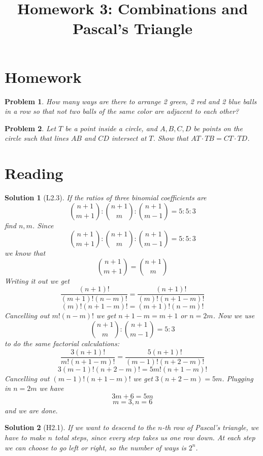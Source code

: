 \documentclass[a4paper,12pt]{article}
\title{Homework 3: Combinations and Pascal's Triangle}
\theoremstyle{perfect}
\newtheorem{prb}{Problem}
\newtheorem{sol}{Solution}
\begin{document}
 
\maketitle

\section{Homework}

\begin{prb}
How many ways are there to arrange 2 green, 2 red and 2 blue balls in a row so that not two balls of the same color are adjacent to each other?
\end{prb}

\begin{prb}
Let $T$ be a point inside a circle, and $A, B, C, D$ be points on the circle such that lines $AB$ and $CD$ intersect at $T$. Show that $AT\cdot TB = CT \cdot TD$.
\end{prb}

\section{Reading}

\begin{sol}[L2.3]
\textit{If the ratios of three binomial coefficients are} $${{n+1} \choose {m+1}} : {{n+1} \choose {m}} : {{n+1} \choose {m-1}} = 5 : 5 : 3$$ \textit{find $n,m$}.
Since $${{n+1} \choose {m+1}} : {{n+1} \choose {m}} : {{n+1} \choose {m-1}} = 5 : 5 : 3$$ we know that $${{n+1} \choose {m+1}} = {{n+1} \choose {m}}$$
Writing it out we get 
$$\frac{(n+1)!}{(m+1)!(n-m)!} = \frac{(n+1)!}{(m)!(n+1-m)!}$$
$$(m)!(n+1-m)! = (m+1)!(n-m)!$$
Cancelling out $m!(n-m)!$ we get $n+1-m = m+1$ or $n = 2m$.
Now we use 
$${{n+1} \choose {m}} : {{n+1} \choose {m-1}} = 5 : 3$$ 
to do the same factorial calculations:
$$\frac{3(n+1)!}{m!(n+1-m)!} = \frac{5(n+1)!}{(m-1)!(n+2-m)!}$$
$$3(m-1)!(n+2-m)! = 5m!(n+1-m)!$$
Cancelling out $(m-1)!(n+1-m)!$ we get $3(n+2-m) = 5m$. Plugging in $n= 2m$ we have $$3m + 6 = 5m$$
$$m = 3, n = 6$$
and we are done.
\end{sol}

\begin{sol}[H2.1]
If we want to descend to the $n$-th row of Pascal's triangle, we have to make $n$ total steps, since every step takes us one row down. At each step we can choose to go left or right, so the number of ways is $2^n$.
\end{sol}
\end{document}
